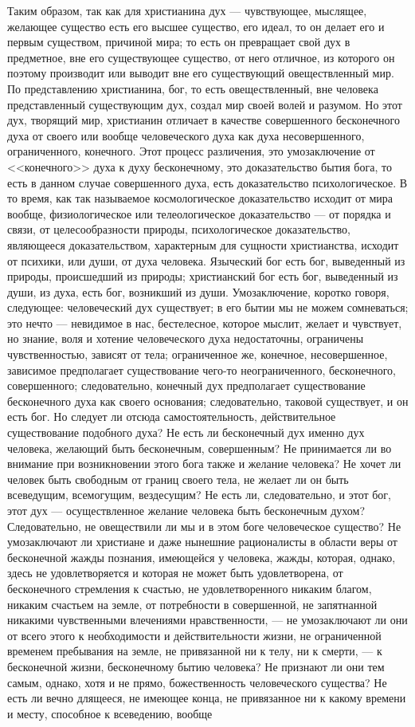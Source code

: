 \documentclass[12pt]{article}
\begin{document}
Таким образом, так как для христианина дух --- чувствующее, мыслящее, желающее существо есть его высшее существо, его идеал, то он делает его и первым существом, причиной мира; то есть он превращает свой дух в предметное, вне его существующее существо, от него отличное, из которого он поэтому производит или выводит вне его существующий овеществленный мир. По представлению христианина, бог, то есть овеществленный, вне человека представленный существующим дух, создал мир своей волей и разумом. Но этот дух, творящий мир, христианин отличает в качестве совершенного бесконечного духа от своего или вообще человеческого духа как духа несовершенного, ограниченного, конечного. Этот процесс различения, это умозаключение от <<конечного>> духа к духу бесконечному, это доказательство бытия бога, то есть в данном случае совершенного духа, есть доказательство психологическое. В то время, как так называемое космологическое доказательство исходит от мира вообще, физиологическое или телеологическое доказательство --- от порядка и связи, от целесообразности природы, психологическое доказательство, являющееся доказательством, характерным для сущности христианства, исходит от психики, или души, от духа человека. Языческий бог есть бог, выведенный из природы, происшедший из природы; христианский бог есть бог, выведенный из души, из духа, есть бог, возникший из души. Умозаключение, коротко говоря, следующее: человеческий дух существует; в его бытии мы не можем сомневаться; это нечто --- невидимое в нас, бестелесное, которое мыслит, желает и чувствует, но знание, воля и хотение человеческого духа недостаточны, ограничены чувственностью, зависят от тела; ограниченное же, конечное, несовершенное, зависимое предполагает существование чего-то неограниченного, бесконечного, совершенного; следовательно, конечный дух предполагает существование бесконечного духа как своего основания; следовательно, таковой существует, и он есть бог. Но следует ли отсюда самостоятельность, действительное существование подобного духа? Не есть ли бесконечный дух именно дух человека, желающий быть бесконечным, совершенным? Не принимается ли во внимание при возникновении этого бога также и желание человека? Не хочет ли человек быть свободным от границ своего тела, не желает ли он быть всеведущим, всемогущим, вездесущим? Не есть ли, следовательно, и этот бог, этот дух --- осуществленное желание человека быть бесконечным духом? Следовательно, не овеществили ли мы и в этом боге человеческое существо? Не умозаключают ли христиане и даже нынешние рационалисты в области веры от бесконечной жажды познания, имеющейся у человека, жажды, которая, однако, здесь не удовлетворяется и которая не может быть удовлетворена, от бесконечного стремления к счастью, не удовлетворенного никаким благом, никаким счастьем на земле, от потребности в совершенной, не запятнанной никакими чувственными влечениями нравственности, --- не умозаключают ли они от всего этого к необходимости и действительности жизни, не ограниченной временем пребывания на земле, не привязанной ни к телу, ни к смерти, --- к бесконечной жизни, бесконечному бытию человека? Не признают ли они тем самым, однако, хотя и не прямо, божественность человеческого существа? Не есть ли вечно длящееся, не имеющее конца, не привязанное ни к какому времени и месту, способное к всеведению, вообще 
\end{document}
